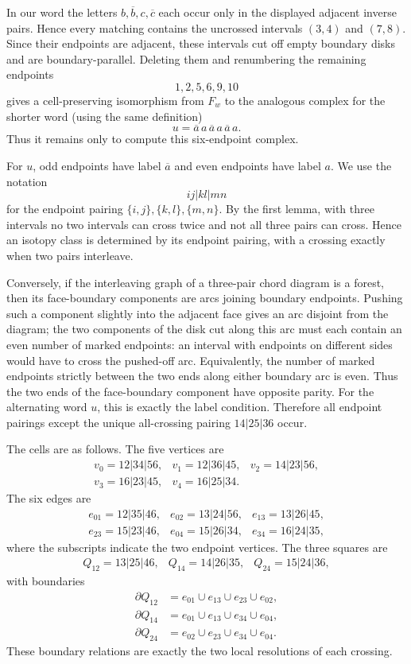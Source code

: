 \documentclass[12pt]{article}
\newcommand{\ol}{\overline}
\begin{document}
In our word the letters \(b,\ol b,c,\ol c\) each occur only in the
displayed adjacent inverse pairs.  Hence every matching contains the
uncrossed intervals \((3,4)\) and \((7,8)\).  Since their endpoints are
adjacent, these intervals cut off empty boundary disks and are
boundary-parallel.  Deleting
them and renumbering the remaining endpoints
\[
        1,2,5,6,9,10
\]
gives a cell-preserving isomorphism from \(F_w\) to the analogous
complex for the shorter word (using the same definition)
\[
        u=\ol a\,a\,\ol a\,a\,\ol a\,a .
\]
Thus it remains only to compute this six-endpoint complex.

For \(u\), odd endpoints have label \(\ol a\) and even endpoints have
label \(a\).  We use the notation
\[
        ij|kl|mn
\]
for the endpoint pairing \(\{i,j\},\{k,l\},\{m,n\}\).  By the first
lemma, with three intervals no two intervals can cross twice and not
all three pairs can cross.  Hence an isotopy class is determined by its
endpoint pairing, with a crossing exactly when two pairs interleave.

Conversely, if the interleaving graph of a three-pair chord diagram is a
forest, then its face-boundary components are arcs joining boundary
endpoints.  Pushing such a component slightly into the adjacent face
gives an arc disjoint from the diagram; the two components of the disk
cut along this arc must each contain an even number of marked endpoints:
an interval with endpoints on different sides would have to cross the
pushed-off arc.  Equivalently, the number of marked endpoints strictly
between the two ends along either boundary arc is even.  Thus the two
ends of the face-boundary component have opposite parity.
For the alternating word \(u\), this is exactly the label condition.
Therefore all endpoint pairings except the unique all-crossing pairing
\(14|25|36\) occur.

The cells are as follows.  The five vertices are
\[
\begin{array}{lll}
v_0=12|34|56, & v_1=12|36|45, & v_2=14|23|56,\\
v_3=16|23|45, & v_4=16|25|34. &
\end{array}
\]
The six edges are
\[
\begin{array}{lll}
e_{01}=12|35|46, & e_{02}=13|24|56, & e_{13}=13|26|45,\\
e_{23}=15|23|46, & e_{04}=15|26|34, & e_{34}=16|24|35,
\end{array}
\]
where the subscripts indicate the two endpoint vertices.  The three
squares are
\[
\begin{array}{lll}
Q_{12}=13|25|46, & Q_{14}=14|26|35, & Q_{24}=15|24|36,
\end{array}
\]
with boundaries
\[
\begin{aligned}
\partial Q_{12}&=e_{01}\cup e_{13}\cup e_{23}\cup e_{02},\\
\partial Q_{14}&=e_{01}\cup e_{13}\cup e_{34}\cup e_{04},\\
\partial Q_{24}&=e_{02}\cup e_{23}\cup e_{34}\cup e_{04}.
\end{aligned}
\]
These boundary relations are exactly the two local resolutions of each
crossing.
\end{document}
